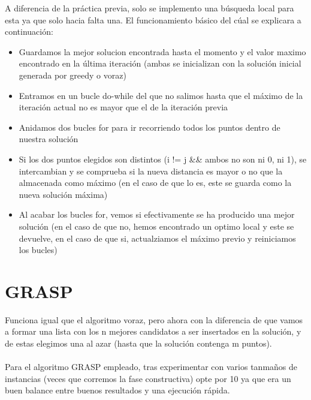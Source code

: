 A diferencia de la práctica previa, solo se implemento una búsqueda local para esta ya que solo hacia falta una. El funcionamiento básico del cúal se explicara a continuación:
\\
\begin{itemize}
  \item Guardamos la mejor solucion encontrada hasta el momento y el valor maximo encontrado en la última iteración (ambas se inicializan con la solución inicial generada por greedy o voraz)
  \item Entramos en un bucle do-while del que no salimos hasta que el máximo de la iteración actual no es mayor que el de la iteración previa
  \item Anidamos dos bucles for para ir recorriendo todos los puntos dentro de nuestra solución
  \item Si los dos puntos elegidos son distintos (i != j \&\& ambos no son ni 0, ni 1), se intercambian y se comprueba si la nueva distancia es mayor o no que la almacenada como máximo (en el caso de que lo es, este se guarda como la nueva solución máxima)
  \item Al acabar los bucles for, vemos si efectivamente se ha producido una mejor solución (en el caso de que no, hemos encontrado un optimo local y este se devuelve, en el caso de que si, actualziamos el máximo previo y reiniciamos los bucles)
\end{itemize}
 
\section{GRASP}
Funciona igual que el algoritmo voraz, pero ahora con la diferencia de que vamos a formar una lista con los n mejores candidatos a ser insertados en la solución, y de estas elegimos una al azar (hasta que la solución contenga m puntos).
\\
\\
Para el algoritmo GRASP empleado, tras experimentar con varios tanmaños de instancias (veces que corremos la fase constructiva) opte por 10 ya que era un buen balance entre buenos resultados y una ejecución rápida. 

